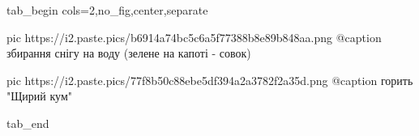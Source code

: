  
 
 
 
 


\ifcmt
  tab_begin cols=2,no_fig,center,separate

		 pic https://i2.paste.pics/b6914a74bc5c6a5f77388b8e89b848aa.png
		 @caption збирання снігу на воду (зелене на капоті - совок)

		 pic https://i2.paste.pics/77f8b50c88ebe5df394a2a3782f2a35d.png
		 @caption горить "Щирий кум"

  tab_end
\fi

